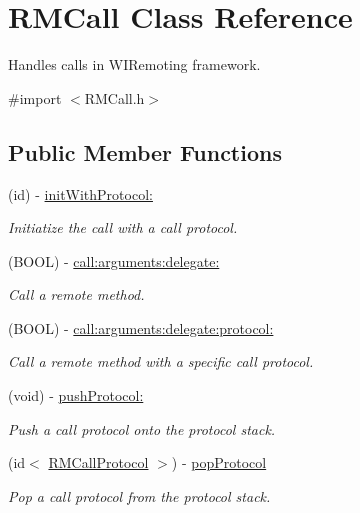 \hypertarget{interface_r_m_call}{
\section{RMCall Class Reference}
\label{interface_r_m_call}
}


Handles calls in WIRemoting framework.  


{\ttfamily \#import $<$RMCall.h$>$}\subsection*{Public Member Functions}
\begin{DoxyCompactItemize}
\item 
(id) -\/ \hyperlink{interface_r_m_call_a64f1e76758d2d473859064c5b0c6c75d}{initWithProtocol:}
\begin{DoxyCompactList}\small\item\em Initiatize the call with a call protocol. \item\end{DoxyCompactList}\item 
(BOOL) -\/ \hyperlink{interface_r_m_call_a85bb3ac47600a313105a6f94c9ab7ec3}{call:arguments:delegate:}
\begin{DoxyCompactList}\small\item\em Call a remote method. \item\end{DoxyCompactList}\item 
(BOOL) -\/ \hyperlink{interface_r_m_call_ae6750e4bc12f50170b839e1b96227a87}{call:arguments:delegate:protocol:}
\begin{DoxyCompactList}\small\item\em Call a remote method with a specific call protocol. \item\end{DoxyCompactList}\item 
(void) -\/ \hyperlink{interface_r_m_call_afb23a22f89df78e62f45f2af2dd41623}{pushProtocol:}
\begin{DoxyCompactList}\small\item\em Push a call protocol onto the protocol stack. \item\end{DoxyCompactList}\item 
(id$<$ \hyperlink{protocol_r_m_call_protocol-p}{RMCallProtocol} $>$) -\/ \hyperlink{interface_r_m_call_a2f55cbd7d34e98e4dbc74e1d8d8facf8}{popProtocol}
\begin{DoxyCompactList}\small\item\em Pop a call protocol from the protocol stack. \item\end{DoxyCompactList}\item 

\end{DoxyCompactItemize}
